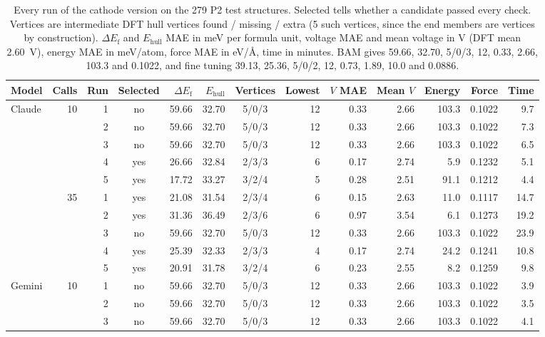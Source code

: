 \begin{table}[h]
\caption{Every run of the cathode version on the 279 P2 test structures. Selected tells whether a candidate passed every check. Vertices are intermediate DFT hull vertices found / missing / extra (5 such vertices, since the end members are vertices by construction). $\Delta E_\mathrm{f}$ and $E_{\mathrm{hull}}$ MAE in meV per formula unit, voltage MAE and mean voltage in V (DFT mean 2.60~V), energy MAE in meV/atom, force MAE in eV/\AA, time in minutes. BAM gives 59.66, 32.70, 5/0/3, 12, 0.33, 2.66, 103.3 and 0.1022, and fine tuning 39.13, 25.36, 5/0/2, 12, 0.73, 1.89, 10.0 and 0.0886.}
\label{tab:si-p2runs-all}
\centering
\scriptsize
\renewcommand{\baselinestretch}{1}\selectfont
\renewcommand{\arraystretch}{0.9}
\setlength{\tabcolsep}{2.5pt}
\begin{tabular}{lrrcrrcrrrrrr}
\toprule
Model & Calls & Run & Selected & $\Delta E_\mathrm{f}$ & $E_{\mathrm{hull}}$ & Vertices & Lowest & $V$ MAE & Mean $V$ & Energy & Force & Time \\
\midrule
Claude & 10 & 1 & no & 59.66 & 32.70 & 5/0/3 & 12 & 0.33 & 2.66 & 103.3 & 0.1022 & 9.7 \\
 &  & 2 & no & 59.66 & 32.70 & 5/0/3 & 12 & 0.33 & 2.66 & 103.3 & 0.1022 & 7.3 \\
 &  & 3 & no & 59.66 & 32.70 & 5/0/3 & 12 & 0.33 & 2.66 & 103.3 & 0.1022 & 6.5 \\
 &  & 4 & yes & 26.66 & 32.84 & 2/3/3 & 6 & 0.17 & 2.74 & 5.9 & 0.1232 & 5.1 \\
 &  & 5 & yes & 17.72 & 33.27 & 3/2/4 & 5 & 0.28 & 2.51 & 91.1 & 0.1212 & 4.4 \\
\cmidrule(lr){2-13}
 & 35 & 1 & yes & 21.08 & 31.54 & 2/3/4 & 6 & 0.15 & 2.63 & 11.0 & 0.1117 & 14.7 \\
 &  & 2 & yes & 31.36 & 36.49 & 2/3/6 & 6 & 0.97 & 3.54 & 6.1 & 0.1273 & 19.2 \\
 &  & 3 & no & 59.66 & 32.70 & 5/0/3 & 12 & 0.33 & 2.66 & 103.3 & 0.1022 & 23.9 \\
 &  & 4 & yes & 25.39 & 32.33 & 2/3/3 & 4 & 0.17 & 2.74 & 24.2 & 0.1241 & 10.8 \\
 &  & 5 & yes & 20.91 & 31.78 & 3/2/4 & 6 & 0.23 & 2.55 & 8.2 & 0.1259 & 9.8 \\
\midrule
Gemini & 10 & 1 & no & 59.66 & 32.70 & 5/0/3 & 12 & 0.33 & 2.66 & 103.3 & 0.1022 & 3.9 \\
 &  & 2 & no & 59.66 & 32.70 & 5/0/3 & 12 & 0.33 & 2.66 & 103.3 & 0.1022 & 3.5 \\
 &  & 3 & no & 59.66 & 32.70 & 5/0/3 & 12 & 0.33 & 2.66 & 103.3 & 0.1022 & 4.1 \\

\end{tabular}
\end{table}
